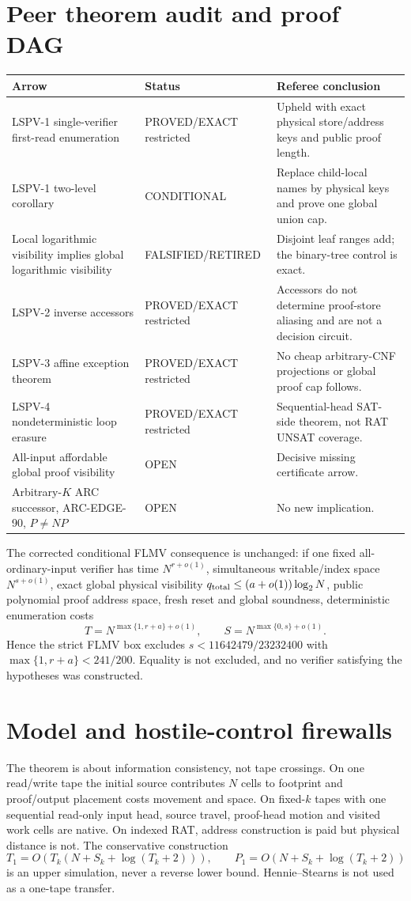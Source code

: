 \documentclass[11pt]{article}
\begin{document}
\section{Peer theorem audit and proof DAG}
\begin{center}\small
\begin{tabularx}{.98\linewidth}{p{.38\linewidth}p{.21\linewidth}X}
\toprule
Arrow & Status & Referee conclusion\\ \midrule
LSPV-1 single-verifier first-read enumeration &
PROVED/EXACT restricted &
Upheld with exact physical store/address keys and public proof length.\\
LSPV-1 two-level corollary &
CONDITIONAL &
Replace child-local names by physical keys and prove one global union cap.\\
Local logarithmic visibility implies global logarithmic visibility &
FALSIFIED/RETIRED &
Disjoint leaf ranges add; the binary-tree control is exact.\\
LSPV-2 inverse accessors &
PROVED/EXACT restricted &
Accessors do not determine proof-store aliasing and are not a decision
circuit.\\
LSPV-3 affine exception theorem &
PROVED/EXACT restricted &
No cheap arbitrary-CNF projections or global proof cap follows.\\
LSPV-4 nondeterministic loop erasure &
PROVED/EXACT restricted &
Sequential-head SAT-side theorem, not RAT UNSAT coverage.\\
All-input affordable global proof visibility &
OPEN &
Decisive missing certificate arrow.\\
Arbitrary-$K$ ARC successor, ARC-EDGE-90, $P\ne NP$ &
OPEN &
No new implication.\\
\bottomrule
\end{tabularx}
\end{center}

The corrected conditional FLMV consequence is unchanged: if one fixed
all-ordinary-input verifier has time $N^{r+o(1)}$, simultaneous
writable/index space $N^{s+o(1)}$, exact global physical visibility
$q_{\rm total}\le(a+o(1))\log_2N$, public polynomial proof address space,
fresh reset and global soundness, deterministic enumeration costs
\[
T=N^{\max\{1,r+a\}+o(1)},\qquad
S=N^{\max\{0,s\}+o(1)}.
\]
Hence the strict FLMV box excludes
$s<11642479/23232400$ with
$\max\{1,r+a\}<241/200$. Equality is not excluded, and no verifier
satisfying the hypotheses was constructed.

\section{Model and hostile-control firewalls}
The theorem is about information consistency, not tape crossings. On one
read/write tape the initial source contributes $N$ cells to footprint and
proof/output placement costs movement and space. On fixed-$k$ tapes with
one sequential read-only input head, source travel, proof-head motion and
visited work cells are native. On indexed RAT, address construction is paid
but physical distance is not. The conservative construction
\[
T_1=O(T_k(N+S_k+\log(T_k+2))),\qquad
P_1=O(N+S_k+\log(T_k+2))
\]
is an upper simulation, never a reverse lower bound. Hennie--Stearns is not
used as a one-tape transfer.
\end{document}
